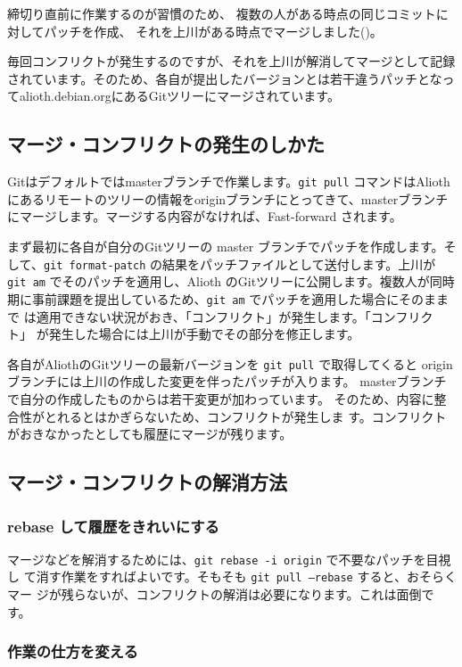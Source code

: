 \documentclass[mingoth,a4paper]{jsarticle}
\begin{document}
締切り直前に作業するのが習慣のため、
複数の人がある時点の同じコミットに対してパッチを作成、
それを上川がある時点でマージしました()。

毎回コンフリクトが発生するのですが、それを上川が解消してマージとして記録
されています。そのため、各自が提出したバージョンとは若干違うパッチとなっ
てalioth.debian.orgにあるGitツリーにマージされています。

\subsection{マージ・コンフリクトの発生のしかた}

Gitはデフォルトではmasterブランチで作業します。\texttt{git pull} コマンドはAlioth
にあるリモートのツリーの情報をoriginブランチにとってきて、masterブランチ
にマージします。マージする内容がなければ、Fast-forward されます。

まず最初に各自が自分のGitツリーの master ブランチでパッチを作成します。そ
して、\texttt{git format-patch} の結果をパッチファイルとして送付します。上川が
\texttt{git am} でそのパッチを適用し、Alioth のGitツリーに公開します。複数人が同時
期に事前課題を提出しているため、\texttt{git am} でパッチを適用した場合にそのままで
は適用できない状況がおき、「コンフリクト」が発生します。「コンフリクト」
が発生した場合には上川が手動でその部分を修正します。

各自がAliothのGitツリーの最新バージョンを \texttt{git pull} で取得してくると
origin ブランチには上川の作成した変更を伴ったパッチが入ります。
masterブランチで自分の作成したものからは若干変更が加わっています。
そのため、内容に整合性がとれるとはかぎらないため、コンフリクトが発生しま
す。コンフリクトがおきなかったとしても履歴にマージが残ります。

\subsection{マージ・コンフリクトの解消方法}

\subsubsection{rebase して履歴をきれいにする}

マージなどを解消するためには、\texttt{git rebase -i origin} で不要なパッチを目視し
て消す作業をすればよいです。そもそも \texttt{git pull --rebase} すると、おそらくマー
ジが残らないが、コンフリクトの解消は必要になります。これは面倒です。

\subsubsection{作業の仕方を変える}
\end{document}

